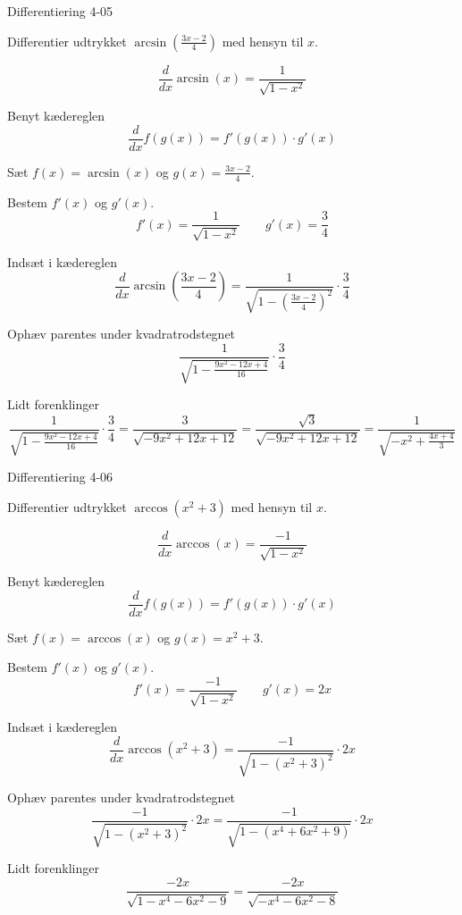 \documentclass{article}
\begin{document}
\begin{exercise}{Differentiering 4-05}

Differentier udtrykket $\arcsin\left( \frac{3x - 2}{4} \right)$ med hensyn til $x$.


\hint
\[
\frac{d}{dx} \arcsin(x) = \frac{1}{\sqrt{1 - x^2}}
\]


\hint
Benyt kædereglen
\[
\frac{d}{dx} f(g(x)) = f'(g(x)) \cdot g'(x)
\]

\hint
Sæt $f(x) = \arcsin(x)$ og $g(x) = \frac{3x - 2}{4}$.

\hint
Bestem $f'(x)$ og $g'(x)$.
\[
f'(x) = \frac{1}{\sqrt{1 - x^2}} \qquad g'(x) = \frac{3}{4}
\]

\hint
Indsæt i kædereglen
\[
\frac{d}{dx} \arcsin\left( \frac{3x - 2}{4} \right) = \frac{1}{\sqrt{1 - \left( \frac{3x - 2}{4}\right)^2}} \cdot \frac{3}{4}
\]

\hint
Ophæv parentes under kvadratrodstegnet
\[
\frac{1}{\sqrt{1 - \frac{9x^2 - 12x + 4}{16}}} \cdot \frac{3}{4}
\]

\hint
Lidt forenklinger
\[
\frac{1}{\sqrt{1 - \frac{ 9x^2 - 12x + 4}{16}}} \cdot \frac{3}{4} = \frac{3}{\sqrt{-9x^2 + 12x + 12}} = \frac{\sqrt{3}}{\sqrt{-9x^2 + 12x + 12}} = \frac{1}{\sqrt{-x^2 + \frac{4x + 4}{3}}}
\]
\end{exercise}

\begin{exercise}{Differentiering 4-06}

Differentier udtrykket $\arccos\left( x^2 + 3 \right)$ med hensyn til $x$.


\hint
\[
\frac{d}{dx} \arccos(x) = \frac{-1}{\sqrt{1 - x^2}}
\]


\hint
Benyt kædereglen
\[
\frac{d}{dx} f(g(x)) = f'(g(x)) \cdot g'(x)
\]

\hint
Sæt $f(x) = \arccos(x)$ og $g(x) = x^2 + 3$.

\hint
Bestem $f'(x)$ og $g'(x)$.
\[
f'(x) = \frac{-1}{\sqrt{1 - x^2}} \qquad g'(x) = 2x
\]

\hint
Indsæt i kædereglen
\[
\frac{d}{dx} \arccos\left( x^2 + 3 \right) = \frac{-1}{\sqrt{1 - \left( x^2 + 3 \right)^2}} \cdot 2x
\]

\hint
Ophæv parentes under kvadratrodstegnet
\[
\frac{-1}{\sqrt{1 - \left( x^2 + 3 \right)^2}} \cdot 2x = \frac{-1}{\sqrt{1 - \left( x^4 + 6x^2 + 9 \right)}} \cdot 2x
\]

\hint
Lidt forenklinger
\[
\frac{-2x}{\sqrt{1 - x^4 - 6x^2 - 9}} = \frac{-2x}{\sqrt{- x^4 - 6x^2 - 8}}
\]
\end{exercise}
\end{document}
